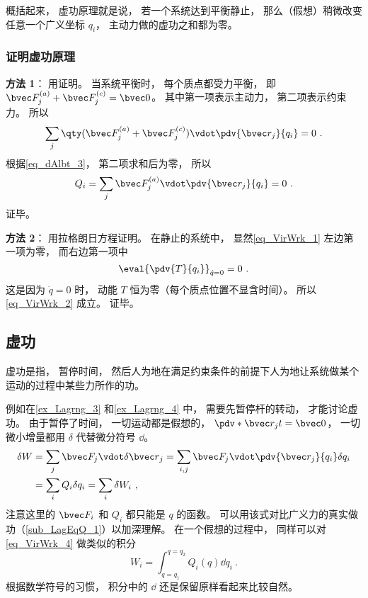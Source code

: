 概括起来， 虚功原理就是说， 若一个系统达到平衡静止， 那么（假想）稍微改变任意一个广义坐标 $q_i$， 主动力做的虚功之和都为零。

\subsubsection{证明虚功原理}
\textbf{方法 1}： 用证明。 当系统平衡时， 每个质点都受力平衡， 即 $\bvec F_j^{(a)}+\bvec F_j^{(c)} = \bvec 0$。 其中第一项表示主动力，  第二项表示约束力。 所以
\begin{equation}
\sum_j \qty(\bvec F_j^{(a)}+\bvec F_j^{(c)}) \vdot \pdv{\bvec r_j}{q_i} = 0~.
\end{equation}
根据\autoref{eq_dAlbt_3}， 第二项求和后为零， 所以
\begin{equation}
Q_i = \sum_j \bvec F_j^{(a)} \vdot \pdv{\bvec r_j}{q_i} = 0~.
\end{equation}
证毕。

\textbf{方法 2}： 用拉格朗日方程证明。 在静止的系统中， 显然\autoref{eq_VirWrk_1} 左边第一项为零， 而右边第一项中
\begin{equation}
\eval{\pdv{T}{q_i}}_{\dot q = 0} = 0~.
\end{equation}
这是因为 $\dot q = 0$ 时， 动能 $T$ 恒为零（每个质点位置不显含时间）。 所以\autoref{eq_VirWrk_2} 成立。 证毕。

\subsection{虚功}\label{sub_VirWrk_1}
虚功是指， 暂停时间， 然后人为地在满足约束条件的前提下人为地让系统做某个运动的过程中某些力所作的功。

例如在\autoref{ex_Lagrng_3} 和\autoref{ex_Lagrng_4} 中， 需要先暂停杆的转动， 才能讨论虚功。 由于暂停了时间， 一切运动都是假想的， $\pdv*{\bvec r_j}{t} = \bvec 0$， 一切微小增量都用 $\delta$ 代替微分符号 $\dd{}$。
\begin{equation}\label{eq_VirWrk_4}
\begin{aligned}
\delta{W} &= \sum_j \bvec F_j \vdot \delta{\bvec r}_j
= \sum_{i,j} \bvec F_j \vdot \pdv{\bvec r_j}{q_i}\delta q_i\\
&= \sum_i Q_i \delta q_i = \sum_i \delta{W_i}~,
\end{aligned}
\end{equation}
注意这里的 $\bvec F_i$ 和 $Q_i$ 都只能是 $q$ 的函数。 可以用该式对比广义力的真实做功（\autoref{sub_LagEqQ_1}）以加深理解。 在一个假想的过程中， 同样可以对\autoref{eq_VirWrk_4} 做类似的积分
\begin{equation}
W_i = \int_{q=q_1}^{q=q_2} Q_i(q) \dd q_i~.
\end{equation}
根据数学符号的习惯， 积分中的 $\dd{}$ 还是保留原样看起来比较自然。
